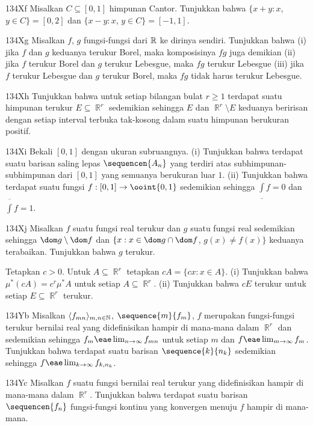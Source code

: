 {\spheader 134Xf Misalkan $C\subseteq[0,1]$ himpunan Cantor. Tunjukkan bahwa
$\{x+y:x$, $y\in C\}=[0,2]$ dan $\{x-y:x$, $y\in C\}=[-1,1]$.

\spheader 134Xg Misalkan $f$, $g$ fungsi-fungsi dari $\Bbb R$ ke dirinya
sendiri. Tunjukkan bahwa (i) jika $f$ dan $g$ keduanya terukur Borel, maka
komposisinya $fg$ juga demikian (ii) jika $f$ terukur Borel dan $g$ terukur
Lebesgue, maka $fg$ terukur Lebesgue (iii) jika $f$ terukur Lebesgue dan $g$
terukur Borel, maka $fg$ tidak harus terukur Lebesgue.

\spheader 134Xh Tunjukkan bahwa untuk setiap bilangan bulat $r\ge 1$
terdapat suatu himpunan terukur $E\subseteq\BbbR^r$ sedemikian sehingga
$E$ dan $\BbbR^r\setminus E$ keduanya beririsan dengan setiap interval
terbuka tak-kosong dalam suatu himpunan berukuran positif.

\spheader 134Xi Bekali $[0,1]$ dengan ukuran subruangnya. (i) Tunjukkan bahwa
terdapat suatu barisan saling lepas $\sequencen{A_n}$ yang terdiri atas
subhimpunan-subhimpunan dari $[0,1]$ yang semuanya berukuran luar $1$.
(ii) Tunjukkan bahwa terdapat suatu fungsi $f:[0,1]\to\ooint{0,1}$
sedemikian sehingga $\underline{\int}f=0$ dan $\overline{\int}f=1$.

\spheader 134Xj Misalkan $f$ suatu fungsi real terukur dan $g$ suatu fungsi
real sedemikian sehingga $\dom g\setminus\dom f$ dan
$\{x:x\in\dom g\cap\dom f$, $g(x)\ne f(x)\}$ keduanya terabaikan.
Tunjukkan bahwa $g$ terukur.

Tetapkan $c>0$. Untuk $A\subseteq\BbbR^r$ tetapkan
$cA=\{cx:x\in A\}$. (i) Tunjukkan bahwa $\mu^*(cA)=c^r\mu^*A$ untuk setiap
$A\subseteq\BbbR^r$. (ii) Tunjukkan bahwa $cE$ terukur untuk setiap
$E\subseteq\BbbR^r$ terukur.

\spheader 134Yb Misalkan $\langle f_{mn}\rangle_{m,n\in\Bbb N}$,
$\sequence{m}{f_m}$, $f$ merupakan fungsi-fungsi terukur bernilai real yang
didefinisikan hampir di mana-mana dalam $\BbbR^r$ dan sedemikian sehingga
$f_m\eae\lim_{n\to\infty}f_{mn}$ untuk setiap $m$ dan
$f\eae\lim_{m\to\infty}f_m$. Tunjukkan bahwa terdapat suatu barisan
$\sequence{k}{n_k}$ sedemikian sehingga
$f\eae\lim_{k\to\infty}f_{k,n_k}$.

\spheader 134Yc Misalkan $f$ suatu fungsi bernilai real terukur yang
didefinisikan hampir di mana-mana dalam $\BbbR^r$. Tunjukkan bahwa terdapat
suatu barisan $\sequencen{f_n}$ fungsi-fungsi kontinu yang konvergen menuju
$f$ hampir di mana-mana. 

}
